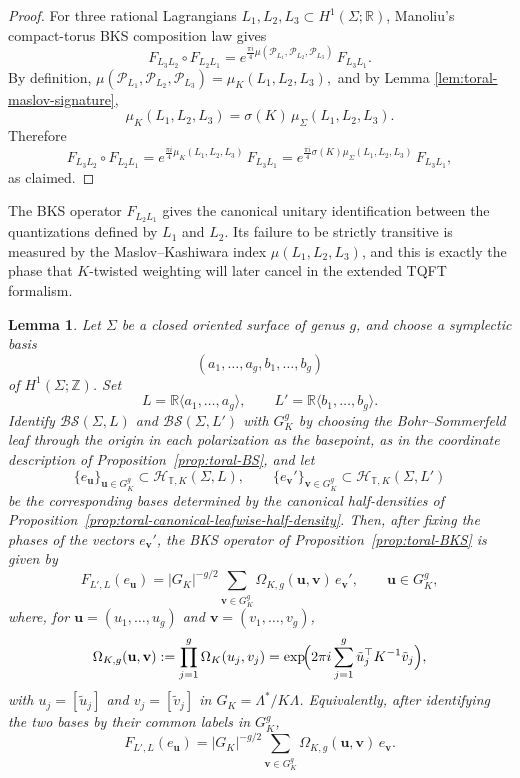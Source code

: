 \documentclass[12pt]{amsart}
\numberwithin{equation}{section}
\newtheorem{lemma}[theorem]{Lemma}
\begin{document}
\begin{proof}
For three rational Lagrangians $L_1,L_2,L_3\subset H^1(\Sigma;\mathbb R)$, Manoliu's compact-torus
BKS composition law gives
\[
F_{L_3L_2}\circ F_{L_2L_1}
=
e^{\frac{\pi i}{4}\mu(\mathcal P_{L_1},\mathcal P_{L_2},\mathcal P_{L_3})}
\,F_{L_3L_1}.
\]
By definition, $\mu(\mathcal P_{L_1},\mathcal P_{L_2},\mathcal P_{L_3})
=
\mu_K(L_1,L_2,L_3),$ and by Lemma \ref{lem:toral-maslov-signature},
\[
\mu_K(L_1,L_2,L_3)=\sigma(K)\,\mu_\Sigma(L_1,L_2,L_3).
\]
Therefore
\[
F_{L_3L_2}\circ F_{L_2L_1}
=
e^{\frac{\pi i}{4}\mu_K(L_1,L_2,L_3)}\,F_{L_3L_1}
=
e^{\frac{\pi i}{4}\sigma(K)\mu_\Sigma(L_1,L_2,L_3)}\,F_{L_3L_1},
\]
as claimed.
\end{proof}

The BKS operator \(F_{L_2L_1}\) gives the canonical unitary identification between the quantizations defined by \(L_1\) and \(L_2\). Its failure to be strictly transitive is measured by the Maslov--Kashiwara index
\(\mu(L_1,L_2,L_3)\), and this is exactly the phase that $K$-twisted weighting will later cancel in the extended TQFT formalism.

\begin{lemma}\label{lem:genus-BKS-fourier}
Let $\Sigma$ be a closed oriented surface of genus $g$, and choose a symplectic basis
\[
(a_1,\dots,a_g,b_1,\dots,b_g)
\]
of $H^1(\Sigma;\mathbb Z)$. Set
\[
L=\mathbb R\langle a_1,\dots,a_g\rangle,\qquad
L'=\mathbb R\langle b_1,\dots,b_g\rangle .
\]
Identify $\mathcal{BS}(\Sigma,L)$ and $\mathcal{BS}(\Sigma,L')$ with $G_K^g$
by choosing the Bohr--Sommerfeld leaf through the origin in each polarization as the
basepoint, as in the coordinate description of Proposition~\ref{prop:toral-BS}, and let
\[
\{e_{\mathbf u}\}_{\mathbf u\in G_K^g}\subset \mathcal H_{\mathbb T,K}(\Sigma,L),\qquad
\{e_{\mathbf v}'\}_{\mathbf v\in G_K^g}\subset \mathcal H_{\mathbb T,K}(\Sigma,L')
\]
be the corresponding bases determined by the canonical half-densities of
Proposition~\ref{prop:toral-canonical-leafwise-half-density}. Then, after fixing the
phases of the vectors $e_{\mathbf v}'$, the BKS operator of
Proposition~\ref{prop:toral-BKS} is given by
\[
F_{L',L}(e_{\mathbf u})
=
|G_K|^{-g/2}\sum_{\mathbf v\in G_K^g}\Omega_{K,g}(\mathbf u,\mathbf v)\,e_{\mathbf v}',
\qquad \mathbf u\in G_K^g,
\]
where, for $\mathbf u=(u_1,\dots,u_g)$ and $\mathbf v=(v_1,\dots,v_g)$,
\[
\Omega_{K,g}(\mathbf u,\mathbf v)
:=
\prod_{j=1}^g \Omega_K(u_j,v_j)
=
\exp\!\Bigl(2\pi i\sum_{j=1}^g \tilde u_j^{\top}K^{-1}\tilde v_j\Bigr),
\]
with $u_j=[\tilde u_j]$ and $v_j=[\tilde v_j]$ in $G_K=\Lambda^*/K\Lambda$.
Equivalently, after identifying the two bases by their common labels in $G_K^g$,
\[
F_{L',L}(e_{\mathbf u})
=
|G_K|^{-g/2}\sum_{\mathbf v\in G_K^g}\Omega_{K,g}(\mathbf u,\mathbf v)\,e_{\mathbf v}.
\]
\end{lemma}
\end{document}
